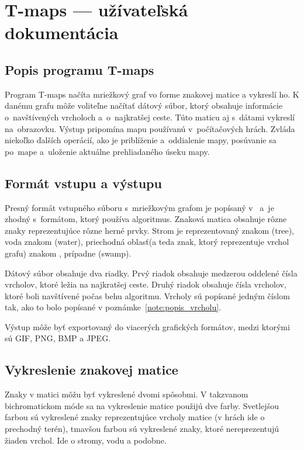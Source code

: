 \chapter{T-maps --- užívateľská dokumentácia}
\label{userdoc}
\section{Popis programu T-maps}
Program T-maps načíta mriežkový graf vo forme znakovej matice a vykreslí ho. K danému grafu môže voliteľne načítať dátový súbor, ktorý obsahuje
informácie o~navštívených vrcholoch a~o~najkratšej ceste.
Túto maticu aj s~dátami vykreslí na~obrazovku. Výstup pripomína mapu používanú v~počítačových hrách.
Zvláda niekoľko ďalších operácií, ako je priblíženie a~oddialenie mapy, posúvanie sa po~mape a~uloženie aktuálne prehliadaného úseku mapy.


\section{Formát vstupu a výstupu}
Presný formát vstupného súboru s~mriežkovým grafom je popísaný v~\cite{sturtevant2012benchmarks} a~je zhodný s~formátom, 
ktorý používa algoritmus. Znaková matica obsahuje rôzne znaky reprezentujúce rôzne herné prvky.
Strom je reprezentovaný znakom (tree), voda znakom (water), priechodná oblasť(a teda znak, ktorý reprezentuje
vrchol grafu) znakom , prípadne  (swamp).

Dátový súbor obsahuje dva riadky. Prvý riadok obsahuje medzerou oddelené čísla vrcholov, ktoré ležia na najkratšej ceste.
Druhý riadok obsahuje čísla vrcholov, ktoré boli navštívené počas behu algoritmu. 
Vrcholy sú popísané jedným číslom tak, ako to bolo popísané v poznámke~\ref{note:popis_vrcholu}.

Výstup môže byť exportovaný do viacerých grafických formátov, medzi ktorými sú GIF, PNG, BMP a JPEG.



\section{Vykreslenie znakovej matice}

Znaky v matici môžu byť vykreslené dvomi spôsobmi. V takzvanom bichromatickom móde sa na vykreslenie matice použijú dve farby.
Svetlejšou farbou sú vykreslené znaky reprezentujúce vrcholy matice (v hrách ide o prechodný terén), tmavšou farbou sú vykreslené znaky, ktoré
nereprezentujú žiaden vrchol. Ide o stromy, vodu a podobne.

